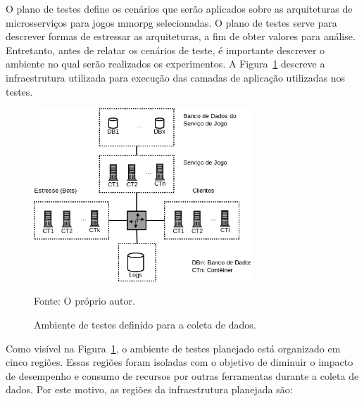 O plano de testes define os cenários que serão aplicados sobre as arquiteturas de microsserviços para jogos \ac{mmorpg} selecionadas.
%
O plano de testes serve para descrever formas de estressar as arquiteturas, a fim de obter valores para análise.
%
Entretanto, antes de relatar os cenários de teste, é importante descrever o ambiente no qual serão realizados os experimentos.
%
A Figura~\ref{Ambiente de testes} descreve a infraestrutura utilizada para execução das camadas de aplicação utilizadas nos testes.



\begin{figure}[htb!]
  \caption{Ambiente de testes definido para a coleta de dados.}
  \label{Ambiente de testes}
  \includegraphics[height=6.5cm]{img/cap3/infraestrutura.png}
  \centering

  Fonte: O próprio autor.
\end{figure}



Como visível na Figura~\ref{Ambiente de testes}, o ambiente de testes planejado está organizado em cinco regiões.
%
Essas regiões foram isoladas com o objetivo de diminuir o impacto de desempenho e consumo de recursos por outras ferramentas durante a coleta de dados.
%
Por este motivo, as regiões da infraestrutura planejada são:



